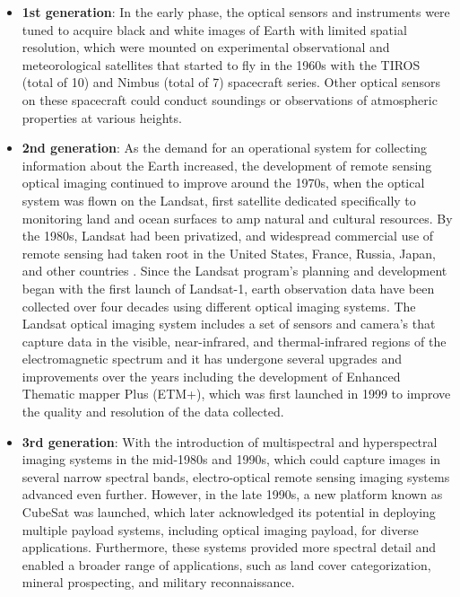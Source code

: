 \documentclass[final,5p,times,twocolumn]{elsarticle}
\begin{document}
\begin{itemize}
	\item \textbf{1st generation}: In the early phase, the optical sensors and instruments were tuned to acquire black and white images of Earth with limited spatial resolution, which were mounted on experimental observational and meteorological satellites that started to fly in the 1960s \citep{nicholas1999} with the TIROS (total of 10) and Nimbus (total of 7) spacecraft series. Other optical sensors on these spacecraft could conduct soundings or observations of atmospheric properties at various heights.
	\item \textbf{2nd generation}: As the demand for an operational system for collecting information about the Earth increased, the development of remote sensing optical imaging continued to improve around the 1970s, when the optical system was flown on the Landsat, first satellite dedicated specifically to monitoring land and ocean surfaces to amp natural and cultural resources. By the 1980s, Landsat had been privatized, and widespread commercial use of remote sensing had taken root in the United States, France, Russia, Japan, and other countries \citep{nicholas1999}. Since the Landsat program's planning and development began with the first launch of Landsat-1, earth observation data have been collected over four decades \citep{wulder2019current} using different optical imaging systems. The Landsat optical imaging system includes a set of sensors and camera's that capture data in the visible, near-infrared, and thermal-infrared regions of the electromagnetic spectrum and it has undergone several upgrades and improvements over the years including the development of Enhanced Thematic mapper Plus (ETM+), which was first launched in 1999 to improve the quality and resolution of the data collected. 
	\item \textbf{3rd generation}: With the introduction of multispectral and hyperspectral imaging systems in the mid-1980s and 1990s, which could capture images in several narrow spectral bands, electro-optical remote sensing imaging systems advanced even further. However, in the late 1990s, a new platform known as CubeSat was launched, which later acknowledged its potential \citep{poghosyan2017cubesat} in deploying multiple payload systems, including optical imaging payload, for diverse applications. Furthermore, these systems provided more spectral detail and enabled a broader range of applications, such as land cover categorization, mineral prospecting, and military reconnaissance. 

\end{itemize}
\end{document}
